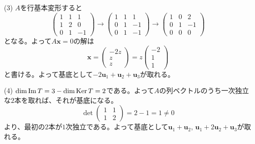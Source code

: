 \noindent (3) $A$を行基本変形すると
\[
\begin{pmatrix}
1 & 1 & 1 \\
1 & 2 & 0 \\
0 & 1 & -1
\end{pmatrix}
\rightarrow
\begin{pmatrix}
1 & 1 & 1 \\
0 & 1 & -1 \\
0 & 1 & -1
\end{pmatrix}
\rightarrow
\begin{pmatrix}
1 & 0 & 2 \\
0 & 1 & -1 \\
0 & 0 & 0
\end{pmatrix}
\]
となる。よって$A\bm{x} = 0$の解は
\[
\bm{x} = 
\begin{pmatrix}
-2z \\
z \\
z
\end{pmatrix}
=
z
\begin{pmatrix}
-2 \\
1 \\
1
\end{pmatrix}
\]
と書ける。よって基底として$-2 \bm{u}_1 + \bm{u}_2 + \bm{u}_3$が取れる。

\noindent (4) $\dim \mathrm{Im}\, T = 3 - \dim \operatorname{Ker} T = 2$である。よって$A$の列ベクトルのうち一次独立な$2$本を取れば、それが基底になる。
\[
\det
\begin{pmatrix}
1 & 1 \\
1 & 2
\end{pmatrix}
= 2 - 1 = 1 \neq 0
\]
より、最初の$2$本が$1$次独立である。よって基底として$\bm{u}_1 + \bm{u}_2$, $\bm{u}_1 + 2\bm{u}_2 + \bm{u}_3$が取れる。



